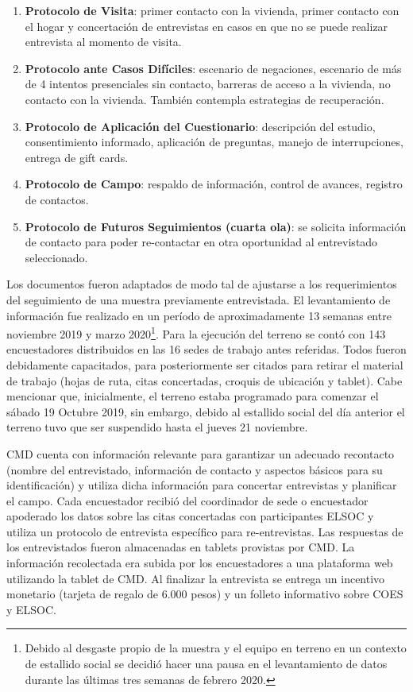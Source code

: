 \documentclass[
]{book}
\begin{document}
\begin{enumerate}
\def\labelenumi{\arabic{enumi}.}
\item
  \textbf{Protocolo de Visita}: primer contacto con la vivienda, primer contacto con el hogar y concertación de entrevistas en casos en que no se puede realizar entrevista al momento de visita.
\item
  \textbf{Protocolo ante Casos Difíciles}: escenario de negaciones, escenario de más de 4 intentos presenciales sin contacto, barreras de acceso a la vivienda, no contacto con la vivienda. También contempla estrategias de recuperación.
\item
  \textbf{Protocolo de Aplicación del Cuestionario}: descripción del estudio, consentimiento informado, aplicación de preguntas, manejo de interrupciones, entrega de gift cards.
\item
  \textbf{Protocolo de Campo}: respaldo de información, control de avances, registro de contactos.
\item
  \textbf{Protocolo de Futuros Seguimientos (cuarta ola)}: se solicita información de contacto para poder re-contactar en otra oportunidad al entrevistado seleccionado.
\end{enumerate}

Los documentos fueron adaptados de modo tal de ajustarse a los requerimientos del seguimiento de una muestra previamente entrevistada. El levantamiento de información fue realizado en un período de aproximadamente 13 semanas entre noviembre 2019 y marzo 2020\footnote{Debido al desgaste propio de la muestra y el equipo en terreno en un contexto de estallido social se decidió hacer una pausa en el levantamiento de datos durante las últimas tres semanas de febrero 2020.}. Para la ejecución del terreno se contó con 143 encuestadores distribuidos en las 16 sedes de trabajo antes referidas. Todos fueron debidamente capacitados, para posteriormente ser citados para retirar el material de trabajo (hojas de ruta, citas concertadas, croquis de ubicación y tablet). Cabe mencionar que, inicialmente, el terreno estaba programado para comenzar el sábado 19 Octubre 2019, sin embargo, debido al estallido social del día anterior el terreno tuvo que ser suspendido hasta el jueves 21 noviembre.

CMD cuenta con información relevante para garantizar un adecuado recontacto (nombre del entrevistado, información de contacto y aspectos básicos para su identificación) y utiliza dicha información para concertar entrevistas y planificar el campo. Cada encuestador recibió del coordinador de sede o encuestador apoderado los datos sobre las citas concertadas con participantes ELSOC y utiliza un protocolo de entrevista específico para re-entrevistas. Las respuestas de los entrevistados fueron almacenadas en tablets provistas por CMD. La información recolectada era subida por los encuestadores a una plataforma web utilizando la tablet de CMD. Al finalizar la entrevista se entrega un incentivo monetario (tarjeta de regalo de 6.000 pesos) y un folleto informativo sobre COES y ELSOC.
\end{document}
